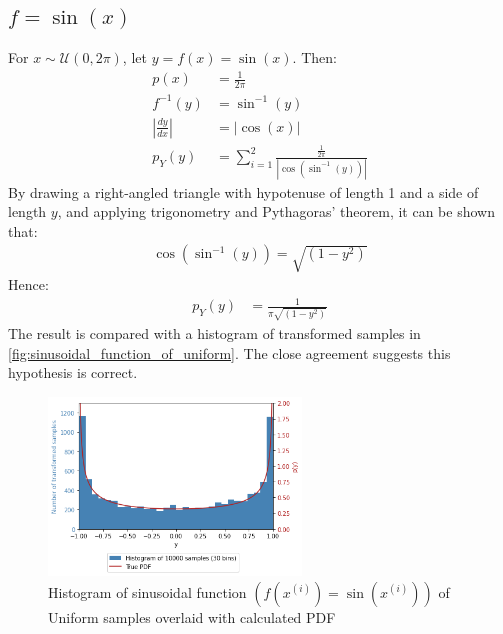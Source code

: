 \documentclass[a4paper]{article}
\begin{document}

\subsection{$f = \sin(x)$}
For $x \sim \mathcal{U}(0, 2\pi)$, let $y = f(x) = \sin(x)$. Then:
\begin{align*}
    p(x) &= \frac{1}{2\pi} \\
    f^{-1}(y) &= \sin^{-1}(y) \\
    \left|\frac{dy}{dx}\right| &= |\cos(x)| \\
    p_Y(y) &= \sum_{i=1}^{2} \frac{\frac{1}{2\pi}}{\left| \cos\left(\sin^{-1}(y)\right) \right|}
\end{align*}
By drawing a right-angled triangle with hypotenuse of length 1 and a side of length $y$, and applying trigonometry and
Pythagoras' theorem, it can be shown that:
\begin{align*}
    \cos\left(\sin^{-1}(y)\right) = \sqrt{\left(1 -y^2 \right)}
\end{align*}
Hence:
\begin{align*}
    p_Y(y) &= \frac{1}{\pi \sqrt{\left(1- y^2\right)}}
\end{align*}
The result is compared with a histogram of transformed samples in \autoref{fig:sinusoidal_function_of_uniform}. The
close agreement suggests this hypothesis is correct.

\begin{figure}[h]
    \centering
    \includegraphics[width=0.6\textwidth]{figures/sinusoidal_function_of_uniform.png}
    \caption{Histogram of sinusoidal function $\left(f(x^{(i)}) = \sin\left(x^{(i)}\right)\right)$ of Uniform samples
    overlaid with calculated PDF}
    \label{fig:sinusoidal_function_of_uniform}
\end{figure}

\end{document}
